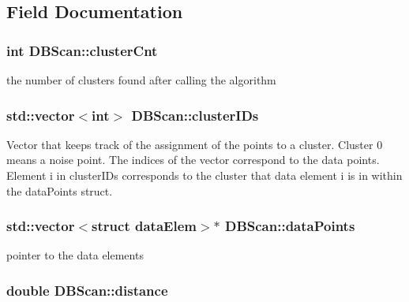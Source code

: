 \subsection{Field Documentation}
\hypertarget{classDBScan_af88f51ce2f50e9f26c813426131497e9}{
\subsubsection[{cluster\-Cnt}]{\setlength{\rightskip}{0pt plus 5cm}int D\-B\-Scan\-::cluster\-Cnt\hspace{0.3cm}{\ttfamily [private]}}}\label{classDBScan_af88f51ce2f50e9f26c813426131497e9}
the number of clusters found after calling the algorithm \hypertarget{classDBScan_aa363c8aa510fcbd54979f16047d5f0a3}{
\subsubsection[{cluster\-I\-Ds}]{\setlength{\rightskip}{0pt plus 5cm}std\-::vector$<$int$>$ D\-B\-Scan\-::cluster\-I\-Ds}}\label{classDBScan_aa363c8aa510fcbd54979f16047d5f0a3}
Vector that keeps track of the assignment of the points to a cluster. Cluster 0 means a noise point. The indices of the vector correspond to the data points. Element i in cluster\-I\-Ds corresponds to the cluster that data element i is in within the data\-Points struct. \hypertarget{classDBScan_a247c7a0e0cd8f2aa24770bced14b82b5}{
\subsubsection[{data\-Points}]{\setlength{\rightskip}{0pt plus 5cm}std\-::vector$<$struct {\bf data\-Elem}$>$$\ast$ D\-B\-Scan\-::data\-Points\hspace{0.3cm}{\ttfamily [private]}}}\label{classDBScan_a247c7a0e0cd8f2aa24770bced14b82b5}
pointer to the data elements \hypertarget{classDBScan_a9878125297973f29db8b41287e0c9b4d}{
\subsubsection[{distance}]{\setlength{\rightskip}{0pt plus 5cm}double D\-B\-Scan\-::distance\hspace{0.3cm}{\ttfamily [private]}}}\label{classDBScan_a9878125297973f29db8b41287e0c9b4d}
